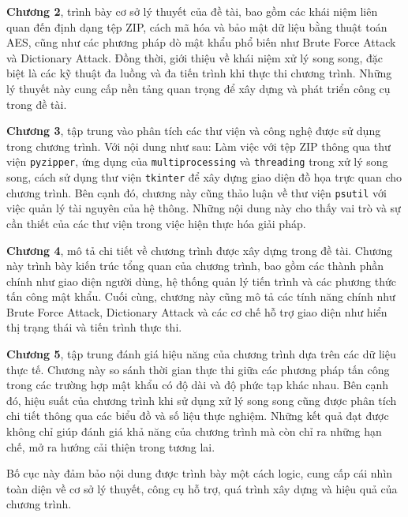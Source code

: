 \documentclass[../DoAn.tex]{subfiles}
\begin{document}
\textbf{Chương 2}, trình bày cơ sở lý thuyết của đề tài, bao gồm các khái niệm liên quan đến định dạng tệp ZIP, cách mã hóa và bảo mật dữ liệu bằng thuật toán AES, cũng như các phương pháp dò mật khẩu phổ biến như Brute Force Attack và Dictionary Attack. Đồng thời, giới thiệu về khái niệm xử lý song song, đặc biệt là các kỹ thuật đa luồng và đa tiến trình khi thực thi chương trình. Những lý thuyết này cung cấp nền tảng quan trọng để xây dựng và phát triển công cụ trong đề tài.

\textbf{Chương 3}, tập trung vào phân tích các thư viện và công nghệ được sử dụng trong chương trình. Với nội dung như sau: Làm việc với tệp ZIP thông qua thư viện \verb|pyzipper|, ứng dụng của \verb|multiprocessing| và \verb|threading| trong xử lý song song, cách sử dụng thư viện \verb|tkinter| để xây dựng giao diện đồ họa trực quan cho chương trình. Bên cạnh đó, chương này cũng thảo luận về thư viện \verb|psutil| với việc quản lý tài nguyên của hệ thông. Những nội dung này cho thấy vai trò và sự cần thiết của các thư viện trong việc hiện thực hóa giải pháp.

\textbf{Chương 4}, mô tả chi tiết về chương trình được xây dựng trong đề tài. Chương này trình bày kiến trúc tổng quan của chương trình, bao gồm các thành phần chính như giao diện người dùng, hệ thống quản lý tiến trình và các phương thức tấn công mật khẩu. Cuối cùng, chương này cũng mô tả các tính năng chính như Brute Force Attack, Dictionary Attack và các cơ chế hỗ trợ giao diện như hiển thị trạng thái và tiến trình thực thi.

\textbf{Chương 5}, tập trung đánh giá hiệu năng của chương trình dựa trên các dữ liệu thực tế. Chương này so sánh thời gian thực thi giữa các phương pháp tấn công trong các trường hợp mật khẩu có độ dài và độ phức tạp khác nhau. Bên cạnh đó, hiệu suất của chương trình khi sử dụng xử lý song song cũng được phân tích chi tiết thông qua các biểu đồ và số liệu thực nghiệm. Những kết quả đạt được không chỉ giúp đánh giá khả năng của chương trình mà còn chỉ ra những hạn chế, mở ra hướng cải thiện trong tương lai.

Bố cục này đảm bảo nội dung được trình bày một cách logic, cung cấp cái nhìn toàn diện về cơ sở lý thuyết, công cụ hỗ trợ, quá trình xây dựng và hiệu quả của chương trình.
\end{document}
